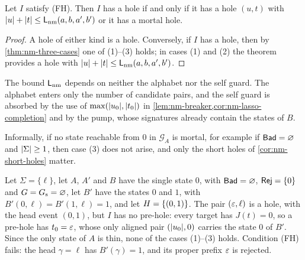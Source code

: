\begin{corollary}\label{cor:nm-short-holes}
Let $I$ satisfy \textup{(FH)}. Then $I$ has a hole if and only if it has a
hole $(u,t)$ with $\lvert u\rvert+\lvert t\rvert\le\mathsf L_{\mathrm{nm}}(a,b,a',b')$ or it has a mortal hole.
\end{corollary}

\begin{proof}
A hole of either kind is a hole. Conversely, if $I$ has a hole, then by
\cref{thm:nm-three-cases} one of (1)--(3) holds; in cases (1) and (2) the theorem
provides a hole with $\lvert u\rvert+\lvert t\rvert\le\mathsf L_{\mathrm{nm}}(a,b,a',b')$.
\end{proof}

The bound $\mathsf L_{\mathrm{nm}}$ depends on neither the alphabet nor the self guard. The
alphabet enters only the number of candidate pairs, and the self guard is
absorbed by the use of $\max(\lvert u_0\rvert,\lvert t_0\rvert)$ in
\cref{lem:nm-breaker,cor:nm-lasso-completion} and by the pump, whose
signatures already contain the states of $B$.

\begin{remark}\label{rem:nm-nonblocking}
Informally, if no state reachable from $0$ in $\mathcal G_A$ is mortal, for
example if $\mathsf{Bad}=\varnothing$ and $\lvert \Sigma\rvert\ge1$, then case (3) does not
arise, and only the short holes of \cref{cor:nm-short-holes} matter.
\end{remark}

\begin{example}\label{ex:nm-fh}
Let $\Sigma=\{\ell\}$, let $A$, $A'$ and $B$ have the single state $0$, with
$\mathsf{Bad}=\varnothing$, $\mathsf{Rej}=\{0\}$ and $G=G_{\mathrm{s}}=\varnothing$, let $B'$ have
the states $0$ and $1$, with $B'(0,\ell)=B'(1,\ell)=1$, and let
$H=\{(0,1)\}$. The pair $(\varepsilon,\ell)$ is a hole, with the head event
$(0,1)$, but $I$ has no pre-hole: every target has $J(t)=0$, so a pre-hole has
$t_0=\varepsilon$, whose only aligned pair $(\lvert u_0\rvert,0)$ carries the state $0$ of
$B'$. Since the only state of $A$ is thin, none of the cases (1)--(3) holds.
Condition (FH) fails: the head $\gamma=\ell$ has $B'(\gamma)=1$, and its proper
prefix $\varepsilon$ is rejected.
\end{example}
